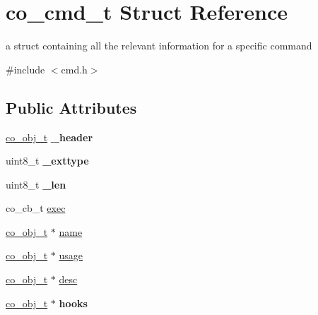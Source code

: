 \hypertarget{structco__cmd__t}{\section{co\-\_\-cmd\-\_\-t Struct Reference}
\label{structco__cmd__t}
}


a struct containing all the relevant information for a specific command  




{\ttfamily \#include $<$cmd.\-h$>$}

\subsection*{Public Attributes}
\begin{DoxyCompactItemize}
\item 
\hypertarget{structco__cmd__t_a1eba06f28ef80ce205820ca7ea9dcb67}{\hyperlink{structco__obj__t}{co\-\_\-obj\-\_\-t} {\bfseries \-\_\-header}}\label{structco__cmd__t_a1eba06f28ef80ce205820ca7ea9dcb67}

\item 
\hypertarget{structco__cmd__t_abe94d4588c6c8774cc9a75d2efb738e3}{uint8\-\_\-t {\bfseries \-\_\-exttype}}\label{structco__cmd__t_abe94d4588c6c8774cc9a75d2efb738e3}

\item 
\hypertarget{structco__cmd__t_a71186cf41b095172ec843be31ad8b5e8}{uint8\-\_\-t {\bfseries \-\_\-len}}\label{structco__cmd__t_a71186cf41b095172ec843be31ad8b5e8}

\item 
co\-\_\-cb\-\_\-t \hyperlink{structco__cmd__t_add04e691f5afa12a19ecc870860d9e82}{exec}
\item 
\hyperlink{structco__obj__t}{co\-\_\-obj\-\_\-t} $\ast$ \hyperlink{structco__cmd__t_ab6400b20e7ea4d71d79c421f57b18862}{name}
\item 
\hyperlink{structco__obj__t}{co\-\_\-obj\-\_\-t} $\ast$ \hyperlink{structco__cmd__t_af73f4d544979225b4f5ef4fe22f855ef}{usage}
\item 
\hyperlink{structco__obj__t}{co\-\_\-obj\-\_\-t} $\ast$ \hyperlink{structco__cmd__t_a97bb000840489763d726b1e81181a5f5}{desc}
\item 
\hypertarget{structco__cmd__t_ae13fb886b0c6932634d8891af7d874ec}{\hyperlink{structco__obj__t}{co\-\_\-obj\-\_\-t} $\ast$ {\bfseries hooks}}\label{structco__cmd__t_ae13fb886b0c6932634d8891af7d874ec}

\end{DoxyCompactItemize}


